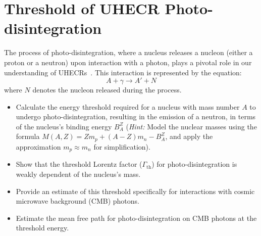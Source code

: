 \section{Threshold of UHECR Photo-disintegration}

The process of photo-disintegration, where a nucleus releases a nucleon (either a proton or a neutron) upon interaction with a photon, plays a pivotal role in our understanding of UHECRs~\cite{1969PhRv..180.1264S}. This interaction is represented by the equation:
%
\[A + \gamma \rightarrow A' + N\]
%
where \(N\) denotes the nucleon released during the process.

\begin{itemize}
\item Calculate the energy threshold required for a nucleus with mass number \(A\) to undergo photo-disintegration, resulting in the emission of a neutron, in terms of the nucleus's binding energy \(B_A^Z\) (\emph{Hint:} Model the nuclear masses using the formula \(M(A,Z) = Z m_p + (A - Z) m_n - B_A^Z\), and apply the approximation \(m_p \approx m_n\) for simplification).
\item Show that the threshold Lorentz factor (\(\Gamma_{\text{th}}\)) for photo-disintegration is weakly dependent of the nucleus's mass. 
\item Provide an estimate of this threshold specifically for interactions with cosmic microwave background (CMB) photons.
\item Estimate the mean free path for photo-disintegration on CMB photons at the threshold energy.
\end{itemize}

